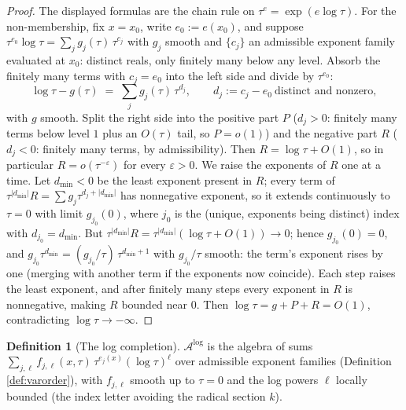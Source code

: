 \documentclass[11pt]{article}
\theoremstyle{definition}
\newtheorem{definition}[theorem]{Definition}
\begin{document}
\begin{proof}
The displayed formulas are the chain rule on $\tau^e = \exp(e\log\tau)$. For the non-membership, fix $x = x_0$, write $e_0 := e(x_0)$, and suppose $\tau^{e_0}\log\tau = \sum_j g_j(\tau)\,\tau^{c_j}$ with $g_j$ smooth and $\{c_j\}$ an admissible exponent family evaluated at $x_0$: distinct reals, only finitely many below any level. Absorb the finitely many terms with $c_j = e_0$ into the left side and divide by $\tau^{e_0}$:
\[
\log\tau - g(\tau) \;=\; \sum_j g_j(\tau)\,\tau^{d_j}, \qquad d_j := c_j - e_0 \ \text{distinct and nonzero},
\]
with $g$ smooth. Split the right side into the positive part $P$ ($d_j > 0$: finitely many terms below level $1$ plus an $O(\tau)$ tail, so $P = o(1)$) and the negative part $R$ ($d_j < 0$: finitely many terms, by admissibility). Then $R = \log\tau + O(1)$, so in particular $R = o(\tau^{-\varepsilon})$ for every $\varepsilon > 0$. We raise the exponents of $R$ one at a time. Let $d_{\min} < 0$ be the least exponent present in $R$; every term of $\tau^{|d_{\min}|} R = \sum g_j \tau^{d_j + |d_{\min}|}$ has nonnegative exponent, so it extends continuously to $\tau = 0$ with limit $g_{j_0}(0)$, where $j_0$ is the (unique, exponents being distinct) index with $d_{j_0} = d_{\min}$. But $\tau^{|d_{\min}|} R = \tau^{|d_{\min}|}(\log\tau + O(1)) \to 0$; hence $g_{j_0}(0) = 0$, and $g_{j_0} \tau^{d_{\min}} = (g_{j_0}/\tau)\,\tau^{d_{\min}+1}$ with $g_{j_0}/\tau$ smooth: the term's exponent rises by one (merging with another term if the exponents now coincide). Each step raises the least exponent, and after finitely many steps every exponent in $R$ is nonnegative, making $R$ bounded near $0$. Then $\log\tau = g + P + R = O(1)$, contradicting $\log\tau \to -\infty$.
\end{proof}

\begin{definition}[The log completion]\label{def:logcompletion}
$\mathcal{A}^{\log}$ is the algebra of sums $\sum_{j,\ell} f_{j,\ell}(x,\tau)\,\tau^{e_j(x)}(\log\tau)^{\ell}$ over admissible exponent families (Definition \ref{def:varorder}), with $f_{j,\ell}$ smooth up to $\tau = 0$ and the log powers $\ell$ locally bounded (the index letter avoiding the radical section $k$).
\end{definition}
\end{document}
